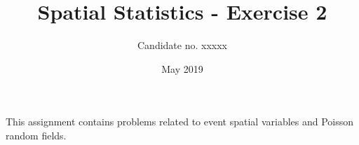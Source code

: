 \documentclass[11pt,a4paper,oneside]{article}
\title{Spatial Statistics - Exercise 2}
\author{Candidate no. xxxxx}
\date{May 2019}
\begin{document}
    \maketitle
    This assignment contains problems related to event spatial variables and Poisson random fields.
    
    
    
    
\end{document}
